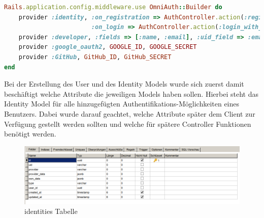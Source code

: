 \documentclass[paper=a4,fontsize=12pt,parskip=half]{scrartcl}
\begin{document}
	\begin{lstlisting}[language=Ruby, style=CodeView, caption=Zu Omniauth hinzugefügte Provider, captionpos=b, label={lst:added_providers}]
Rails.application.config.middleware.use OmniAuth::Builder do
	provider :identity, :on_registration => AuthController.action(:register),
						:on_login => AuthController.action(:login_with_password), :model => PasswordIdentity
	provider :developer, :fields => [:name, :email], :uid_field => :email unless Rails.env.production?
	provider :google_oauth2, GOOGLE_ID, GOOGLE_SECRET
	provider :GitHub, GitHub_ID, GitHub_SECRET
end
	\end{lstlisting}
	
	Bei der Erstellung des User und des Identity Models wurde sich zuerst damit beschäftigt welche Attribute die jeweiligen Models haben sollen. Hierbei steht das Identity Model für alle hinzugefügten Authentifikations-Möglichkeiten eines Benutzers. Dabei wurde darauf geachtet, welche Attribute später dem Client zur Verfügung gestellt werden sollten und welche für spätere Controller Funktionen benötigt werden. 
	
	\begin{figure}[h]
		\includegraphics[width=\textwidth]{images/identities_table.png}
		\caption{identities Tabelle}
		\label{fig:identities_table}
	\end{figure}
	
\end{document}
